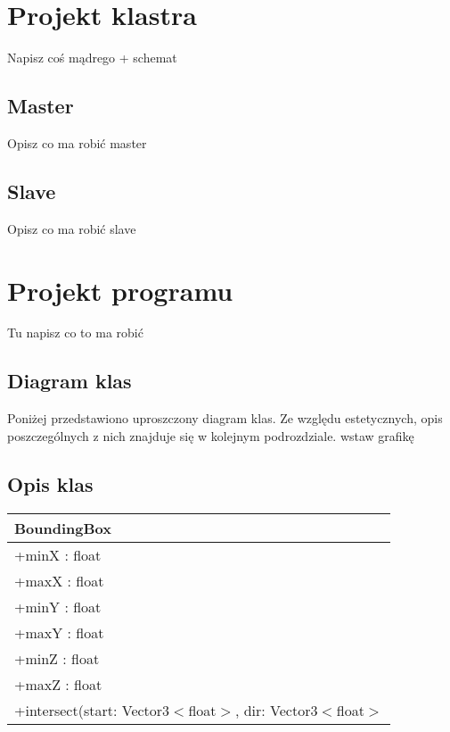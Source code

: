 \section{Projekt klastra}

	Napisz coś mądrego + schemat
	
	\subsection{Master} Opisz co ma robić master
	\subsection{Slave} Opisz co ma robić slave
\section{Projekt programu}

	Tu napisz co to ma robić
	
	\subsection{Diagram klas}
	
	Poniżej przedstawiono uproszczony diagram klas. Ze względu estetycznych, opis poszczególnych z nich znajduje się w kolejnym podrozdziale. wstaw grafikę
	
	
	\subsection{Opis klas}


\begin{center}
    \begin{tabular}{|l|}
    \hline
    BoundingBox \\ \hline
    +minX : float \\
    +maxX : float \\
    +minY : float \\
    +maxY : float \\
    +minZ : float \\
    +maxZ : float \\ 
    \hline
	+intersect(start: Vector3$<$float$>$, dir: Vector3$<$float$>$ \\ 
	\hline
    \end{tabular}
\end{center}


